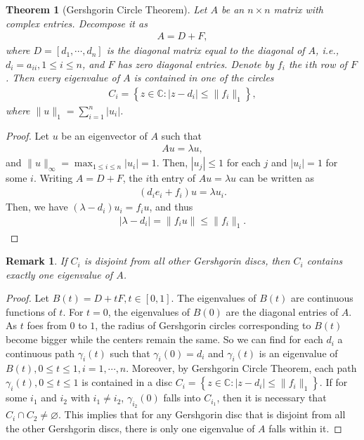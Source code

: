 \documentclass[11pt]{book}
\newtheorem{theorem}{Theorem}[chapter]
\newtheorem{remark}{Remark}[chapter]
\theoremstyle{definition}
\numberwithin{equation}{chapter}
\begin{document}
\begin{subappendices}
\begin{theorem}[Gershgorin Circle Theorem]
Let $A$ be an $n \times n$ matrix with complex entries. Decompose it as 
\begin{align*}
    A = D + F,
\end{align*}
where $D = \left[d_1, \cdots, d_n\right]$ is the diagonal matrix equal to the diagonal of $A$, i.e., $d_i = a_{ii}, 1 \leq i \leq n$, and $F$ has zero diagonal entries. Denote by $f_i$ the $i$th row of $F$. Then every eigenvalue of $A$ is contained in one of the circles
\begin{align*}
    C_i = \left\{z \in \mathbb{C}: |z - d_i| \leq \|f_i\|_1 \right\},
\end{align*}
where $\|u\|_1 = \sum^n_{i=1} |u_i|$.
\end{theorem}
\begin{proof}
Let $u$ be an eigenvector of $A$ such that
\begin{align*}
    Au = \lambda u,
\end{align*}
and $\|u\|_\infty = \max_{1\leq i \leq n}|u_i| = 1$. Then, $|u_j| \leq 1$ for each $j$ and $|u_i| = 1$ for some $i$. Writing $A = D + F$, the $i$th entry of $Au = \lambda u$ can be written as 
\begin{align*}
    (d_i e_i + f_i)u = \lambda u_i.
\end{align*}
Then, we have $(\lambda - d_i)u_i = f_i u$, and thus
\begin{align*}
    |\lambda - d_i| = \|f_i u\| \leq \|f_i\|_1.
\end{align*}
\end{proof}

\begin{remark}
If $C_i$ is disjoint from all other Gershgorin discs, then $C_i$ contains exactly one eigenvalue of $A$.
\end{remark}
\begin{proof}
Let $B(t) = D + tF, t \in [0,1]$. The eigenvalues of $B(t)$ are continuous functions of $t$. For $t = 0$, the eigenvalues of $B(0)$ are the diagonal entries of $A$. As $t$ foes from $0$ to $1$, the radius of Gershgorin circles corresponding to $B(t)$ become bigger while the centers remain the same. So we can find for each $d_i$ a continuous path $\gamma_i(t)$ such that $\gamma_i(0) = d_i$ and $\gamma_i(t)$ is an eigenvalue of $B(t), 0 \leq t \leq 1, i = 1, \cdots, n$. Moreover, by Gershgorin Circle Theorem, each path $\gamma_i(t), 0 \leq t \leq 1$ is contained in a disc $C_i = \left\{z \in \mathbb{C}: |z - d_i| \leq \|f_i\|_1 \right\}$. If for some $i_1$ and $i_2$ with $i_1 \neq i_2$, $\gamma_{i_2}(0)$ falls into $C_{i_1}$, then it is necessary that $C_i \cap C_2 \neq \varnothing$. This implies that for any Gershgorin disc that is disjoint from all the other Gershgorin discs, there is only one eigenvalue of $A$ falls within it.
\end{proof}







\end{subappendices}
\end{document}
